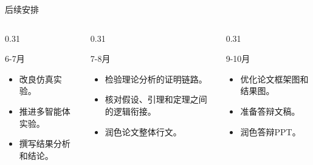 \documentclass{beamer}
\begin{document}
\begin{frame}{后续安排}
    \small
    \begin{columns}[T]
        \begin{column}{0.31\textwidth}
            \begin{block}{6-7月}
                \begin{itemize}
                    \item 改良仿真实验。
                    \item 推进多智能体实验。
                    \item 撰写结果分析和结论。
                \end{itemize}
            \end{block}
        \end{column}
        \begin{column}{0.31\textwidth}
            \begin{block}{7-8月}
                \begin{itemize}
                    \item 检验理论分析的证明链路。
                    \item 核对假设、引理和定理之间的逻辑衔接。
                    \item 润色论文整体行文。
                \end{itemize}
            \end{block}
        \end{column}
        \begin{column}{0.31\textwidth}
            \begin{block}{9-10月}
                \begin{itemize}
                    \item 优化论文框架图和结果图。
                    \item 准备答辩文稿。
                    \item 润色答辩PPT。
                \end{itemize}
            \end{block}
        \end{column}
    \end{columns}

\end{frame}
\end{document}
